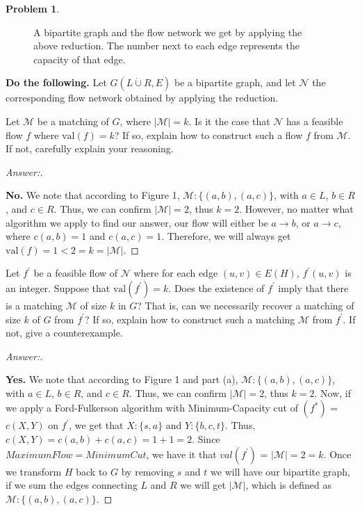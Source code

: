 \documentclass[11pt]{article}
\theoremstyle{definition}
\theoremstyle{definition}
\newtheorem{required}{Problem}
\theoremstyle{definition}
\begin{document}
\begin{required}
\begin{figure}[htbp]
		\caption{A bipartite graph and the flow network we get by applying the above reduction. The number next to each edge represents the capacity of that edge.\label{fig:H}}
	\end{figure}


\noindent \textbf{Do the following.} Let $G(L \dot \cup R, E)$ be a bipartite graph, and let $\mathcal{N}$ the corresponding flow network obtained by applying the reduction.
\begin{enumerate}[label=(\alph*)]
\item Let $\mathcal{M}$ be a matching of $G$, where $|\mathcal{M}| = k$. Is it the case that $\mathcal{N}$ has a feasible flow $f$ where $\text{val}(f) = k$? If so, explain how to construct such a flow $f$ from $\mathcal{M}$. If not, carefully explain your reasoning.

\begin{proof}[Answer:] \

\item \textbf{No.} We note that according to Figure 1, $\mathcal{M}: \{(a, b), (a, c)\}$, with $a \in L$, $b \in R$, and $c \in R$. Thus, we can confirm $|\mathcal{M}| = 2$, thus $k = 2$. However, no matter what algorithm we apply to find our answer, our flow will either be $a \to b$, or $a \to c$, where $c(a, b) = 1$ and $c(a, c) = 1$. Therefore, we will always get $\text{val}(f) = 1 < 2 = k = |\mathcal{M}|$.

\end{proof}


\item Let $f^{\prime}$ be a feasible flow of $\mathcal{N}$ where for each edge $(u, v) \in E(H)$, $f^{\prime}(u, v)$ is an integer. Suppose that $\text{val}(f^{\prime}) = k$. Does the existence of $f^{\prime}$ imply that there is a matching $\mathcal{M}$ of size $k$ in $G$? That is, can we necessarily recover a matching of size $k$ of $G$ from $f^{\prime}$?  If so, explain how to construct such a matching $\mathcal{M}$ from $f^{\prime}$. If not, give a counterexample.

\begin{proof}[Answer:] \

\item \textbf{Yes.} We note that according to Figure 1 and part (a), $\mathcal{M}: \{(a, b), (a, c)\}$, with $a \in L$, $b \in R$, and $c \in R$. Thus, we can confirm $|\mathcal{M}| = 2$, thus $k = 2$. Now, if we apply a Ford-Fulkerson algorithm with Minimum-Capacity cut of $(f^{*})$ = $c(X, Y)$ on $f^{\prime}$, we get that $X: \{s, a\}$ and $Y: \{b, c, t\}$. Thus, $c(X, Y) = c(a, b) + c(a, c) = 1 + 1 = 2$. Since $MaximumFlow = MinimumCut$, we have it that $val(f^{\prime})$ = $|\mathcal{M}| = 2 = k$. Once we transform $H$ back to $G$ by removing $s$ and $t$ we will have our bipartite graph, if we sum the edges connecting $L$ and $R$ we will get $|\mathcal{M}|$, which is defined as $\mathcal{M}: \{(a, b), (a, c)\}$.

\end{proof}


\end{enumerate}
\end{required}

\end{document}
